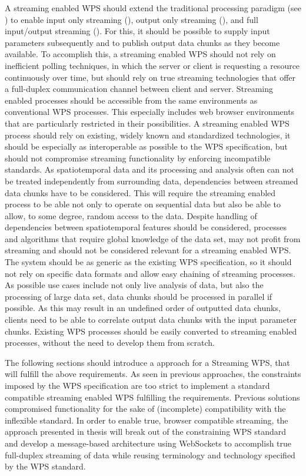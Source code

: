 A streaming enabled \ac{WPS} should extend the traditional processing paradigm (see ) to enable input only streaming (), output only streaming (), and full input/output streaming (). For this, it should be possible to supply input parameters subsequently and to publish output data chunks as they become available. To accomplish this, a streaming enabled \ac{WPS} should not rely on inefficient polling techniques, in which the server or client is requesting a resource continuously over time, but should rely on true streaming technologies that offer a full-duplex communication channel between client and server. Streaming enabled processes should be accessible from the same environments as conventional \ac{WPS} processes. This especially includes web browser environments that are particularly restricted in their possibilities. A streaming enabled \ac{WPS} process should rely on existing, widely known and standardized technologies, it should be especially as interoperable as possible to the \ac{WPS} specification, but should not compromise streaming functionality by enforcing incompatible standards. As spatiotemporal data and its processing and analysis often can not be treated independently from surrounding data, dependencies between streamed data chunks have to be considered. This will require the streaming enabled process to be able not only to operate on sequential data but also be able to allow, to some degree, random access to the data. Despite handling of dependencies between spatiotemporal features should be considered, processes and algorithms that require global knowledge of the data set, may not profit from streaming and should not be considered relevant for a streaming enabled \ac{WPS}. The system should be as generic as the existing \ac{WPS} specification, so it should not rely on specific data formats and allow easy chaining of streaming processes. As possible use cases include not only live analysis of data, but also the processing of large data set, data chunks should be processed in parallel if possible. As this may result in an undefined order of outputted data chunks, clients need to be able to correlate output data chunks with the input parameter chunks. Existing \ac{WPS} processes should be easily converted to streaming enabled processes, without the need to develop them from scratch.

The following sections should introduce a approach for a Streaming \ac{WPS}, that will fulfill the above requirements. As seen in previous approaches, the constraints imposed by the \ac{WPS} specification are too strict to implement a standard compatible streaming enabled WPS fulfilling the requirements. Previous solutions compromised functionality for the sake of (incomplete) compatibility with the inflexible standard. In order to enable true, browser compatible streaming, the approach presented in thesis will break out of the constraining \ac{WPS} standard and develop a message-based architecture using WebSockets to accomplish true full-duplex streaming of data while reusing terminology and technology specified by the \ac{WPS} standard.

